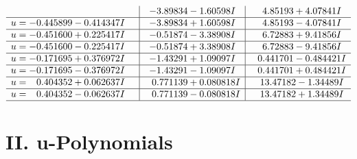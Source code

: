 \documentclass[1p]{elsarticle_modified}
\theoremstyle{definition}
\begin{document}
$$\begin{array}{c|c|c}
 & -3.89834 - 1.60598 I & \phantom{-}4.85193 + 4.07841 I \\ \hline\begin{aligned}
u &= -0.445899 - 0.414347 I\end{aligned}
 & -3.89834 + 1.60598 I & \phantom{-}4.85193 - 4.07841 I \\ \hline\begin{aligned}
u &= -0.451600 + 0.225417 I\end{aligned}
 & -0.51874 - 3.38908 I & \phantom{-}6.72883 + 9.41856 I \\ \hline\begin{aligned}
u &= -0.451600 - 0.225417 I\end{aligned}
 & -0.51874 + 3.38908 I & \phantom{-}6.72883 - 9.41856 I \\ \hline\begin{aligned}
u &= -0.171695 + 0.376972 I\end{aligned}
 & -1.43291 + 1.09097 I & \phantom{-}0.441701 - 0.484421 I \\ \hline\begin{aligned}
u &= -0.171695 - 0.376972 I\end{aligned}
 & -1.43291 - 1.09097 I & \phantom{-}0.441701 + 0.484421 I \\ \hline\begin{aligned}
u &= \phantom{-}0.404352 + 0.062637 I\end{aligned}
 & \phantom{-}0.771139 + 0.080818 I & \phantom{-}13.47182 - 1.34489 I \\ \hline\begin{aligned}
u &= \phantom{-}0.404352 - 0.062637 I\end{aligned}
 & \phantom{-}0.771139 - 0.080818 I & \phantom{-}13.47182 + 1.34489 I\\
 \hline 
 \end{array}$$\newpage
\newpage\renewcommand{\arraystretch}{1}
\centering \section*{ II. u-Polynomials}
\end{document}

